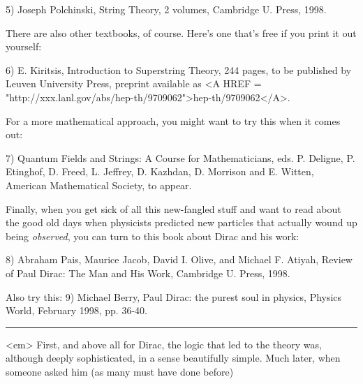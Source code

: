 5) Joseph Polchinski, String Theory, 2 volumes, Cambridge U. Press,
1998.

There are also other textbooks, of course.  Here's one that's free if
you print it out yourself:

6) E. Kiritsis, Introduction to Superstring Theory, 244 pages, 
to be published by Leuven University Press, preprint available
as <A HREF = "http://xxx.lanl.gov/abs/hep-th/9709062">hep-th/9709062</A>.

For a more mathematical approach, you might want to try this when it
comes out:

7) Quantum Fields and Strings: A Course for Mathematicians, eds.
P. Deligne, P. Etinghof, D. Freed, L. Jeffrey, D. Kazhdan, D. Morrison
and E. Witten, American Mathematical Society, to appear.

Finally, when you get sick of all this new-fangled stuff and want 
to read about the good old days when physicists predicted new
particles that actually wound up being \emph{observed}, you can turn to 
this book about Dirac and his work:

8) Abraham Pais, Maurice Jacob, David I. Olive, and Michael F. Atiyah, 
Review of Paul Dirac: The Man and His Work, Cambridge U. Press, 1998.

Also try this:
9) Michael Berry, Paul Dirac: the purest soul in physics, Physics World,
February 1998, pp. 36-40.


 \par\noindent\rule{\textwidth}{0.4pt}
<em> First, and above all for Dirac, the logic that led to the theory was,
although deeply sophisticated, in a sense beautifully simple.
Much later, when someone asked him (as many must have done before)


